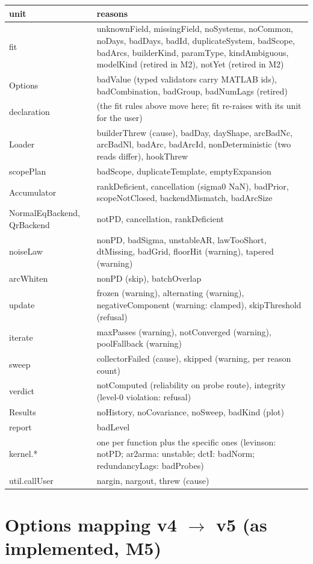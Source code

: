 \begin{longtable}{@{}P{34mm}P{120mm}@{}}
\toprule
unit & reasons\\
\midrule
fit & unknownField, missingField, noSystems, noCommon, noDays, badDays, badId, duplicateSystem, badScope, badArcs, builderKind, paramType, kindAmbiguous, modelKind (retired in M2), notYet (retired in M2)\\
Options & badValue (typed validators carry MATLAB ids), badCombination, badGroup, badNumLags (retired)\\
declaration & (the fit rules above move here; fit re-raises with its unit for the user)\\
Loader & builderThrew (cause), badDay, dayShape, arcBadNc, arcBadNl, badArc, badArcId, nonDeterministic (two reads differ), hookThrew\\
scopePlan & badScope, duplicateTemplate, emptyExpansion\\
Accumulator & rankDeficient, cancellation (sigma0 NaN), badPrior, scopeNotClosed, backendMismatch, badArcSize\\
NormalEqBackend, QrBackend & notPD, cancellation, rankDeficient\\
noiseLaw & nonPD, badSigma, unstableAR, lawTooShort, dtMissing, badGrid, floorHit (warning), tapered (warning)\\
arcWhiten & nonPD (skip), batchOverlap\\
update & frozen (warning), alternating (warning), negativeComponent (warning: clamped), skipThreshold (refusal)\\
iterate & maxPasses (warning), notConverged (warning), poolFallback (warning)\\
sweep & collectorFailed (cause), skipped (warning, per reason count)\\
verdict & notComputed (reliability on probe route), integrity (level-0 violation: refusal)\\
Results & noHistory, noCovariance, noSweep, badKind (plot)\\
report & badLevel\\
kernel.* & one  per function plus the specific ones (levinson: notPD; ar2arma: unstable; dctI: badNorm; redundancyLags: badProbes)\\
util.callUser & nargin, nargout, threw (cause)\\
\bottomrule
\end{longtable}

\chapter{Options mapping v4 $\to$ v5 (as implemented, M5)}


